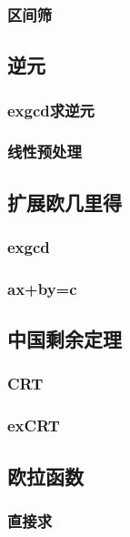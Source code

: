 \documentclass[a4paper,twocolumn]{article}
\begin{document}
\subsubsection{区间筛}

\subsection{逆元}
\subsubsection{exgcd求逆元}

\subsubsection{线性预处理}

\subsection{扩展欧几里得}
\subsubsection{exgcd}

\subsubsection{ax+by=c}

\subsection{中国剩余定理}
\subsubsection{CRT}

\subsubsection{exCRT}

\subsection{欧拉函数}
\begin{spacing}{1.5}

\end{spacing}
\subsubsection{直接求}

\end{document}
